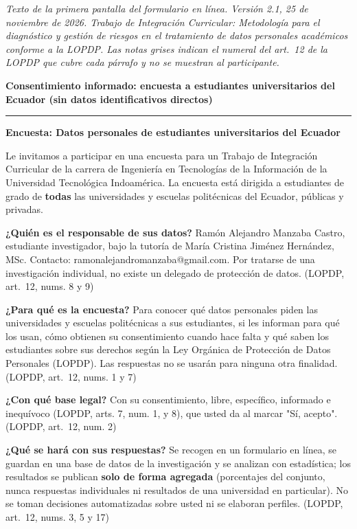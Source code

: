 \documentclass[11pt,a4paper]{article}
\begin{document}
{\small\textit{Texto de la primera pantalla del formulario en línea. Versión 2.1, 25 de noviembre de 2026. Trabajo de Integración Curricular: Metodología para el diagnóstico y gestión de riesgos en el tratamiento de datos personales académicos conforme a la LOPDP. Las notas grises indican el numeral del art.~12 de la LOPDP que cubre cada párrafo y no se muestran al participante.}}
\medskip
\begin{center}{\large\bfseries Consentimiento informado: encuesta a estudiantes universitarios del Ecuador (sin datos identificativos directos)}\end{center}


\medskip\noindent\rule{\textwidth}{0.4pt}\medskip

\textbf{Encuesta: Datos personales de estudiantes universitarios del Ecuador}

Le invitamos a participar en una encuesta para un Trabajo de Integración Curricular de la carrera de Ingeniería en Tecnologías de la Información de la Universidad Tecnológica Indoamérica. La encuesta está dirigida a estudiantes de grado de \textbf{todas} las universidades y escuelas politécnicas del Ecuador, públicas y privadas.

\textbf{¿Quién es el responsable de sus datos?} Ramón Alejandro Manzaba Castro, estudiante investigador, bajo la tutoría de María Cristina Jiménez Hernández, MSc. Contacto: ramonalejandromanzaba@gmail.com. Por tratarse de una investigación individual, no existe un delegado de protección de datos. {\footnotesize\color{gray}(LOPDP, art.~12, nums. 8 y 9)}

\textbf{¿Para qué es la encuesta?} Para conocer qué datos personales piden las universidades y escuelas politécnicas a sus estudiantes, si les informan para qué los usan, cómo obtienen su consentimiento cuando hace falta y qué saben los estudiantes sobre sus derechos según la Ley Orgánica de Protección de Datos Personales (LOPDP). Las respuestas no se usarán para ninguna otra finalidad. {\footnotesize\color{gray}(LOPDP, art.~12, nums. 1 y 7)}

\textbf{¿Con qué base legal?} Con su consentimiento, libre, específico, informado e inequívoco (LOPDP, arts. 7, num. 1, y 8), que usted da al marcar "Sí, acepto". {\footnotesize\color{gray}(LOPDP, art.~12, num. 2)}

\textbf{¿Qué se hará con sus respuestas?} Se recogen en un formulario en línea, se guardan en una base de datos de la investigación y se analizan con estadística; los resultados se publican \textbf{solo de forma agregada} (porcentajes del conjunto, nunca respuestas individuales ni resultados de una universidad en particular). No se toman decisiones automatizadas sobre usted ni se elaboran perfiles. {\footnotesize\color{gray}(LOPDP, art.~12, nums. 3, 5 y 17)}
\end{document}
